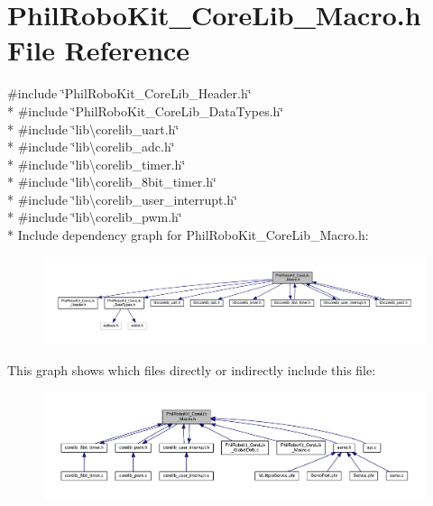 \section{Phil\-Robo\-Kit\-\_\-\-Core\-Lib\-\_\-\-Macro.\-h File Reference}
\label{_phil_robo_kit___core_lib___macro_8h}
{\ttfamily \#include \char`\"{}Phil\-Robo\-Kit\-\_\-\-Core\-Lib\-\_\-\-Header.\-h\char`\"{}}\\*
{\ttfamily \#include \char`\"{}Phil\-Robo\-Kit\-\_\-\-Core\-Lib\-\_\-\-Data\-Types.\-h\char`\"{}}\\*
{\ttfamily \#include \char`\"{}lib\textbackslash{}corelib\-\_\-uart.\-h\char`\"{}}\\*
{\ttfamily \#include \char`\"{}lib\textbackslash{}corelib\-\_\-adc.\-h\char`\"{}}\\*
{\ttfamily \#include \char`\"{}lib\textbackslash{}corelib\-\_\-timer.\-h\char`\"{}}\\*
{\ttfamily \#include \char`\"{}lib\textbackslash{}corelib\-\_\-8bit\-\_\-timer.\-h\char`\"{}}\\*
{\ttfamily \#include \char`\"{}lib\textbackslash{}corelib\-\_\-user\-\_\-interrupt.\-h\char`\"{}}\\*
{\ttfamily \#include \char`\"{}lib\textbackslash{}corelib\-\_\-pwm.\-h\char`\"{}}\\*
Include dependency graph for Phil\-Robo\-Kit\-\_\-\-Core\-Lib\-\_\-\-Macro.\-h\-:\nopagebreak
\begin{figure}[H]
\begin{center}
\leavevmode
\includegraphics[width=350pt]{_phil_robo_kit___core_lib___macro_8h__incl}
\end{center}
\end{figure}
This graph shows which files directly or indirectly include this file\-:\nopagebreak
\begin{figure}[H]
\begin{center}
\leavevmode
\includegraphics[width=350pt]{_phil_robo_kit___core_lib___macro_8h__dep__incl}
\end{center}
\end{figure}
